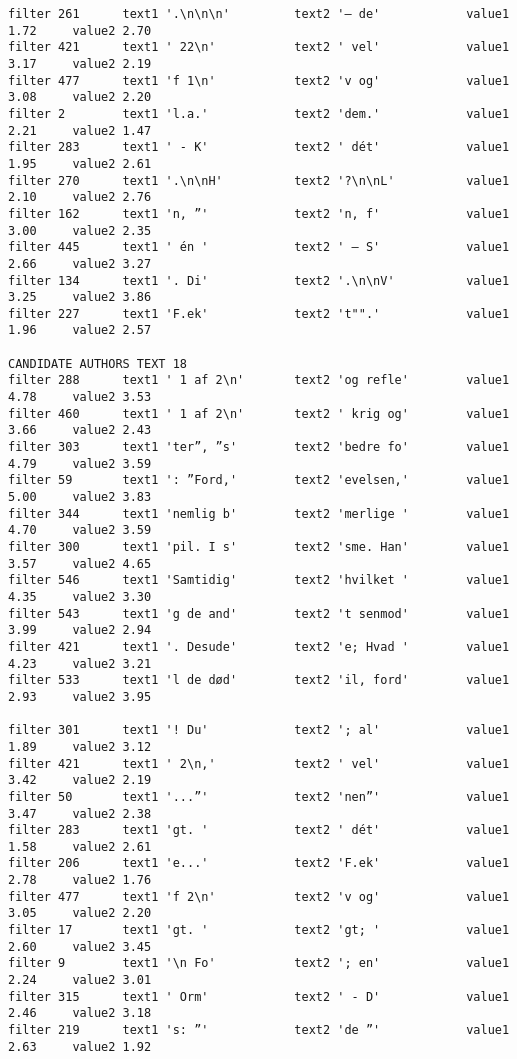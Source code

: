 {\begin{verbatim}
filter 261      text1 '.\n\n\n'         text2 '– de'            value1 1.72     value2 2.70
filter 421      text1 ' 22\n'           text2 ' vel'            value1 3.17     value2 2.19
filter 477      text1 'f 1\n'           text2 'v og'            value1 3.08     value2 2.20
filter 2        text1 'l.a.'            text2 'dem.'            value1 2.21     value2 1.47
filter 283      text1 ' - K'            text2 ' dét'            value1 1.95     value2 2.61
filter 270      text1 '.\n\nH'          text2 '?\n\nL'          value1 2.10     value2 2.76
filter 162      text1 'n, ”'            text2 'n, f'            value1 3.00     value2 2.35
filter 445      text1 ' én '            text2 ' – S'            value1 2.66     value2 3.27
filter 134      text1 '. Di'            text2 '.\n\nV'          value1 3.25     value2 3.86
filter 227      text1 'F.ek'            text2 't"".'            value1 1.96     value2 2.57

CANDIDATE AUTHORS TEXT 18
filter 288      text1 ' 1 af 2\n'       text2 'og refle'        value1 4.78     value2 3.53
filter 460      text1 ' 1 af 2\n'       text2 ' krig og'        value1 3.66     value2 2.43
filter 303      text1 'ter”, ”s'        text2 'bedre fo'        value1 4.79     value2 3.59
filter 59       text1 ': ”Ford,'        text2 'evelsen,'        value1 5.00     value2 3.83
filter 344      text1 'nemlig b'        text2 'merlige '        value1 4.70     value2 3.59
filter 300      text1 'pil. I s'        text2 'sme. Han'        value1 3.57     value2 4.65
filter 546      text1 'Samtidig'        text2 'hvilket '        value1 4.35     value2 3.30
filter 543      text1 'g de and'        text2 't senmod'        value1 3.99     value2 2.94
filter 421      text1 '. Desude'        text2 'e; Hvad '        value1 4.23     value2 3.21
filter 533      text1 'l de død'        text2 'il, ford'        value1 2.93     value2 3.95

filter 301      text1 '! Du'            text2 '; al'            value1 1.89     value2 3.12
filter 421      text1 ' 2\n,'           text2 ' vel'            value1 3.42     value2 2.19
filter 50       text1 '...”'            text2 'nen”'            value1 3.47     value2 2.38
filter 283      text1 'gt. '            text2 ' dét'            value1 1.58     value2 2.61
filter 206      text1 'e...'            text2 'F.ek'            value1 2.78     value2 1.76
filter 477      text1 'f 2\n'           text2 'v og'            value1 3.05     value2 2.20
filter 17       text1 'gt. '            text2 'gt; '            value1 2.60     value2 3.45
filter 9        text1 '\n Fo'           text2 '; en'            value1 2.24     value2 3.01
filter 315      text1 ' Orm'            text2 ' - D'            value1 2.46     value2 3.18
filter 219      text1 's: ”'            text2 'de ”'            value1 2.63     value2 1.92
\end{verbatim}
}
